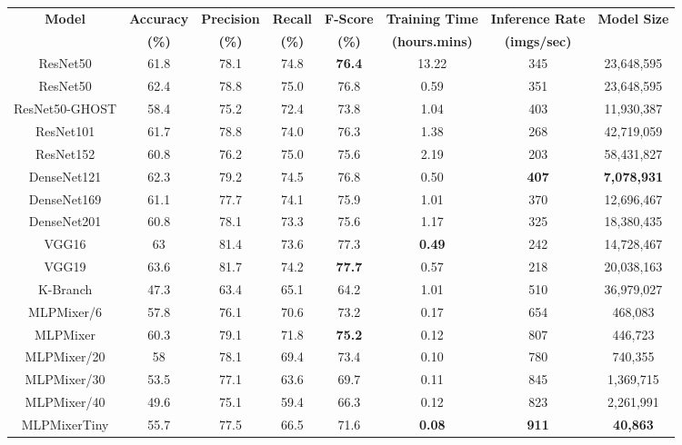 \documentclass[journal]{IEEEtran}
\begin{document}
\begin{table*}[h!]
 \begin{tabular}{c c c c c c c c} 
 \toprule
 \multirow{2}{*}{\parbox{0.8 cm}{\textbf{Model}}} & \textbf{Accuracy} & \textbf{Precision} & \textbf{Recall} & \textbf{F-Score} &  \textbf{Training Time} & \textbf{Inference Rate} &  \textbf{Model Size}\\
    &\textbf{(\%)} &\textbf{(\%)} & \textbf{(\%)} & \textbf{(\%)} & \textbf{(hours.mins)} & \textbf{(imgs/sec)} \\
    
\midrule
 ResNet50 & 61.8 & 78.1 & 74.8 & \textbf{76.4} & 13.22 & 345 & 23,648,595\\
 \hhline{|=|=|=|=|=|=|=|=}
 ResNet50 & 62.4& 78.8 & 75.0 & 76.8& 0.59 &351& 23,648,595\\
 \hline
 ResNet50-GHOST & 58.4 & 75.2 & 72.4 & 73.8 & 1.04 & 403 & 11,930,387\\
 \hline
 ResNet101 & 61.7& 78.8& 74.0&76.3 &1.38 &268 & 42,719,059\\
 \hline
 ResNet152 & 60.8 & 76.2 & 75.0 & 75.6 & 2.19 & 203& 58,431,827\\
 \hline
 DenseNet121 & 62.3 & 79.2& 74.5 & 76.8 & 0.50 &  \textbf{407} & \textbf{7,078,931}\\
 \hline
 DenseNet169 & 61.1& 77.7&74.1 &75.9 & 1.01&370 & 12,696,467\\
 \hline
 DenseNet201 & 60.8 & 78.1& 73.3& 75.6& 1.17&325 &18,380,435\\
 \hline
 VGG16 & 63& 81.4& 73.6& 77.3&\textbf{0.49} & 242&14,728,467\\
 \hline 
 VGG19 & 63.6&81.7 &74.2 & \textbf{77.7}& 0.57 &218 &20,038,163 \\
\hhline{|=|=|=|=|=|=|=|=}
K-Branch & 47.3 & 63.4 & 65.1 & 64.2&1.01&510& 36,979,027 \\
\hhline{|=|=|=|=|=|=|=|=}
 MLPMixer/6 & 57.8 & 76.1 & 70.6 & 73.2 & 0.17 & 654 & 468,083\\
 \hline
 MLPMixer &60.3&79.1&71.8&\textbf{75.2}&0.12& 807& 446,723\\
 \hline
 MLPMixer/20 & 58 & 78.1 & 69.4 & 73.4 & 0.10 & 780 & 740,355\\
\hline
MLPMixer/30 & 53.5 & 77.1 & 63.6 & 69.7& 0.11 & 845 & 1,369,715\\
\hline
MLPMixer/40 &  49.6 & 75.1 & 59.4 & 66.3 & 0.12 & 823 & 2,261,991\\
 \hline
 MLPMixerTiny & 55.7 & 77.5&66.5 &71.6 & \textbf{0.08}& \textbf{911} &  \textbf{40,863}\\

\end{tabular}
\end{table*}
\end{document}
